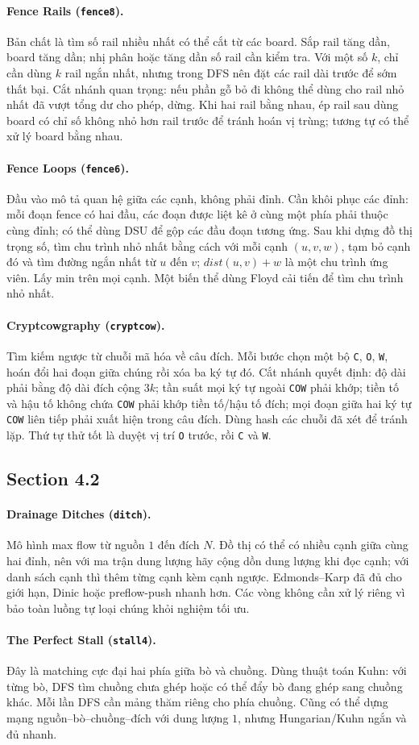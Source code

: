 \documentclass[11pt]{article}
\newcommand{\problem}[2]{\paragraph{#1 (\texttt{#2}).}}
\begin{document}
\problem{Fence Rails}{fence8}
Bản chất là tìm số rail nhiều nhất có thể cắt từ các board. Sắp rail tăng dần, board tăng dần; nhị phân hoặc tăng dần số rail cần kiểm tra. Với một số \(k\), chỉ cần dùng \(k\) rail ngắn nhất, nhưng trong DFS nên đặt các rail dài trước để sớm thất bại. Cắt nhánh quan trọng: nếu phần gỗ bỏ đi không thể dùng cho rail nhỏ nhất đã vượt tổng dư cho phép, dừng. Khi hai rail bằng nhau, ép rail sau dùng board có chỉ số không nhỏ hơn rail trước để tránh hoán vị trùng; tương tự có thể xử lý board bằng nhau.

\problem{Fence Loops}{fence6}
Đầu vào mô tả quan hệ giữa các cạnh, không phải đỉnh. Cần khôi phục các đỉnh: mỗi đoạn fence có hai đầu, các đoạn được liệt kê ở cùng một phía phải thuộc cùng đỉnh; có thể dùng DSU để gộp các đầu đoạn tương ứng. Sau khi dựng đồ thị trọng số, tìm chu trình nhỏ nhất bằng cách với mỗi cạnh \((u,v,w)\), tạm bỏ cạnh đó và tìm đường ngắn nhất từ \(u\) đến \(v\); \(dist(u,v)+w\) là một chu trình ứng viên. Lấy min trên mọi cạnh. Một biến thể dùng Floyd cải tiến để tìm chu trình nhỏ nhất.

\problem{Cryptcowgraphy}{cryptcow}
Tìm kiếm ngược từ chuỗi mã hóa về câu đích. Mỗi bước chọn một bộ \texttt{C}, \texttt{O}, \texttt{W}, hoán đổi hai đoạn giữa chúng rồi xóa ba ký tự đó. Cắt nhánh quyết định: độ dài phải bằng độ dài đích cộng \(3k\); tần suất mọi ký tự ngoài \texttt{COW} phải khớp; tiền tố và hậu tố không chứa \texttt{COW} phải khớp tiền tố/hậu tố đích; mọi đoạn giữa hai ký tự \texttt{COW} liên tiếp phải xuất hiện trong câu đích. Dùng hash các chuỗi đã xét để tránh lặp. Thứ tự thử tốt là duyệt vị trí \texttt{O} trước, rồi \texttt{C} và \texttt{W}.

\subsection*{Section 4.2}

\problem{Drainage Ditches}{ditch}
Mô hình max flow từ nguồn \(1\) đến đích \(N\). Đồ thị có thể có nhiều cạnh giữa cùng hai đỉnh, nên với ma trận dung lượng hãy cộng dồn dung lượng khi đọc cạnh; với danh sách cạnh thì thêm từng cạnh kèm cạnh ngược. Edmonds--Karp đã đủ cho giới hạn, Dinic hoặc preflow-push nhanh hơn. Các vòng không cần xử lý riêng vì bảo toàn luồng tự loại chúng khỏi nghiệm tối ưu.

\problem{The Perfect Stall}{stall4}
Đây là matching cực đại hai phía giữa bò và chuồng. Dùng thuật toán Kuhn: với từng bò, DFS tìm chuồng chưa ghép hoặc có thể đẩy bò đang ghép sang chuồng khác. Mỗi lần DFS cần mảng thăm riêng cho phía chuồng. Cũng có thể dựng mạng nguồn--bò--chuồng--đích với dung lượng \(1\), nhưng Hungarian/Kuhn ngắn và đủ nhanh.
\end{document}
